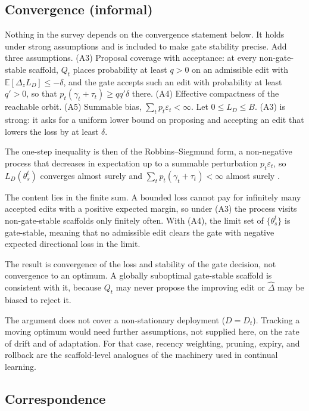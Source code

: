 \subsection{Convergence (informal)}\label{convergence-informal}

Nothing in the survey depends on the convergence statement below. It holds under strong assumptions and is included to make gate stability precise. Add three assumptions. (A3) Proposal coverage with acceptance: at every non-gate-stable scaffold, \(Q_t\) places probability at least \(q > 0\) on an admissible edit with \(\mathbb{E}[\Delta_z L_D] \le -\delta\), and the gate accepts such an edit with probability at least \(q' > 0\), so that \(p_t(\gamma_t + \tau_t) \ge q q' \delta\) there. (A4) Effective compactness of the reachable orbit. (A5) Summable bias, \(\sum_t p_t \varepsilon_t < \infty\). Let \(0 \le L_D \le B\). (A3) is strong: it asks for a uniform lower bound on proposing and accepting an edit that lowers the loss by at least \(\delta\).

The one-step inequality is then of the Robbins--Siegmund form, a non-negative process that decreases in expectation up to a summable perturbation \(p_t \varepsilon_t\), so \(L_D(\theta_s^t)\) converges almost surely and \(\sum_t p_t(\gamma_t + \tau_t) < \infty\) almost surely \cite{robbins1971convergence}.

The content lies in the finite sum. A bounded loss cannot pay for infinitely many accepted edits with a positive expected margin, so under (A3) the process visits non-gate-stable scaffolds only finitely often. With (A4), the limit set of \(\{\theta_s^t\}\) is gate-stable, meaning that no admissible edit clears the gate with negative expected directional loss in the limit.

The result is convergence of the loss and stability of the gate decision, not convergence to an optimum. A globally suboptimal gate-stable scaffold is consistent with it, because \(Q_t\) may never propose the improving edit or \(\widehat{\Delta}\) may be biased to reject it.

The argument does not cover a non-stationary deployment (\(D = D_t\)). Tracking a moving optimum would need further assumptions, not supplied here, on the rate of drift and of adaptation. For that case, recency weighting, pruning, expiry, and rollback are the scaffold-level analogues of the machinery used in continual learning.

\subsection{Correspondence}\label{correspondence}

